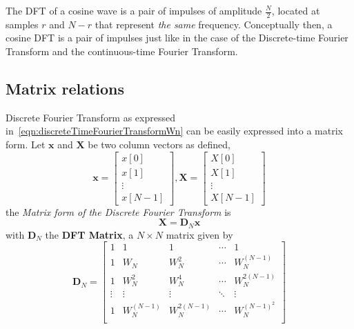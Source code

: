 \documentclass[\documentfontsize, twocolumn]{\classname}
\begin{document}
The DFT of a cosine wave is a pair of impulses of amplitude $\frac N 2$, located at samples $r$ and $N-r$ that represent \emph{the same} frequency. Conceptually then, a cosine DFT is a pair of impulses just like in the case of the Discrete-time Fourier Transform and the continuous-time Fourier Transform.

\subsection{Matrix relations}

Discrete Fourier Transform as expressed in~\ref{eqn:discreteTimeFourierTransformWn} can be easily expressed into a matrix form. Let $\bm x$ and $\bm X$ be two column vectors as defined,
\[
    \bm{x} = \begin{bmatrix} x[0] \\ x[1] \\ \vdots \\ x[N-1] \end{bmatrix},
    \bm{X} = \begin{bmatrix} X[0] \\ X[1] \\ \vdots \\ X[N-1] \end{bmatrix}
\]
the \emph{Matrix form of the Discrete Fourier Transform} is
\begin{equation}\label{eqn:dftMatrixForm}
    \bm{X} = \bm{D}_N\bm{x}
\end{equation}
with $\bm D_N$ the \textbf{DFT Matrix}, a $N \times N$ matrix given by
\begin{equation}\label{eqn:dftMatrixDn}
    \bm D_N = \begin{bmatrix}
        1 & 1 & 1 & \cdots & 1 \\
        1 & W_N & W_N^2 & \cdots & W_N^{(N-1)} \\
        1 & W_N^2 & W_N^4 & \cdots & W_N^{2(N-1)} \\
        \vdots & \vdots & \vdots & \ddots & \vdots \\
        1 & W_N^{(N-1)} & W_N^{2(N-1)} & \cdots & W_N^{(N-1)^2} \\
    \end{bmatrix}
\end{equation}
\end{document}
